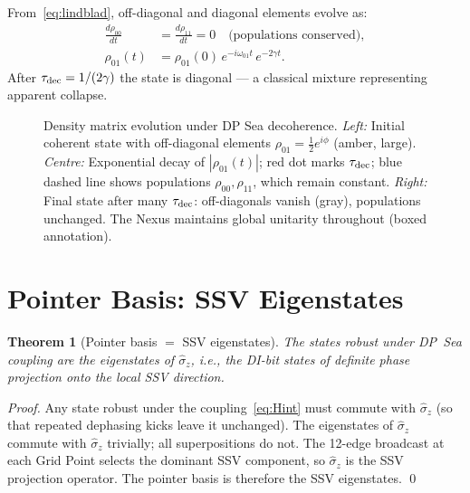 \documentclass[11pt,a4paper]{article}
\newtheorem{theorem}{Theorem}[section]
\begin{document}
From~\eqref{eq:lindblad}, off-diagonal and diagonal elements evolve as:
\begin{align}
\frac{d\rho_{00}}{dt} &= \frac{d\rho_{11}}{dt} = 0
\quad\text{(populations conserved)}, \label{eq:pop}\\
\rho_{01}(t) &= \rho_{01}(0)\,e^{-i\omega_{01}t}\,e^{-2\gamma t}.
\label{eq:offdiag}
\end{align}
After $\tau_{\rm dec} = 1/(2\gamma)$ the state is diagonal --- a
classical mixture representing apparent collapse.

\begin{figure}[H]
\centering

\caption{Density matrix evolution under DP Sea decoherence.
  \textit{Left:} Initial coherent state with off-diagonal elements
  $\rho_{01} = \tfrac12 e^{i\phi}$ (amber, large).
  \textit{Centre:} Exponential decay of $|\rho_{01}(t)|$;
  red dot marks $\tau_{\rm dec}$; blue dashed line shows populations
  $\rho_{00}, \rho_{11}$, which remain constant.
  \textit{Right:} Final state after many $\tau_{\rm dec}$: off-diagonals
  vanish (gray), populations unchanged.  The Nexus maintains global
  unitarity throughout (boxed annotation).}
\label{fig:decoherence}
\end{figure}

\section{Pointer Basis: SSV Eigenstates}

\begin{theorem}[Pointer basis $=$ SSV eigenstates]
\label{thm:pointer}
The states robust under DP~Sea coupling are the eigenstates of
$\hat{\sigma}_z$, i.e., the DI-bit states of definite phase projection
onto the local SSV direction.
\end{theorem}

\begin{proof}
Any state robust under the coupling~\eqref{eq:Hint} must commute with
$\hat{\sigma}_z$ (so that repeated dephasing kicks leave it unchanged).
The eigenstates of $\hat{\sigma}_z$ commute with $\hat{\sigma}_z$
trivially; all superpositions do not.  The 12-edge broadcast at each
Grid Point selects the dominant SSV component, so $\hat{\sigma}_z$ is
the SSV projection operator.  The pointer basis is therefore the SSV
eigenstates. \qed
\end{proof}
\end{document}
